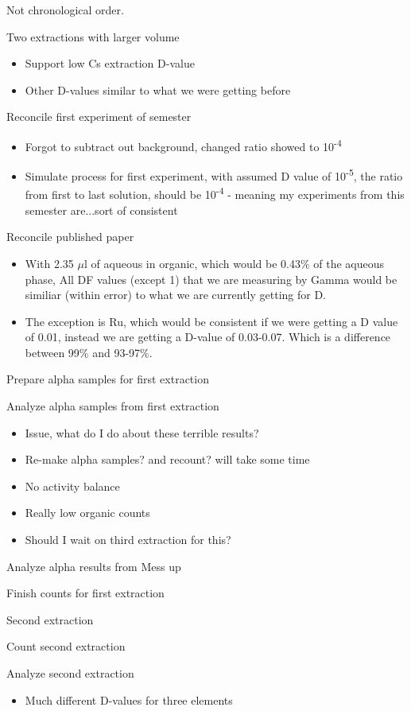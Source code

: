\documentclass[idxtotoc,hyperref,openany,oneside]{labbook} %
\newcommand{\cmark}{\ding{51}}%
\newcommand{\done}{\rlap{$\square$}{\raisebox{2pt}{\large\hspace{1pt}\cmark}}%
  \hspace{-2.5pt}}
\newcommand{\tss}{\textsuperscript}
\begin{document}
Not chronological order.
\begin{todolist}
\item[\done]{Two extractions with larger volume}
  \begin{itemize}
  \item{Support low Cs extraction D-value}
  \item{Other D-values similar to what we were getting before}
  \end{itemize}
\item[\done]{Reconcile first experiment of semester}
  \begin{itemize}
  \item{Forgot to subtract out background, changed ratio showed to 10\tss{-4}}
  \item{Simulate process for first experiment, with assumed D value of 10\tss{-5},
    the ratio from first to last solution, should be 10\tss{-4} - meaning
    my experiments from this semester are...sort of consistent}
  \end{itemize}
\item[\done]{Reconcile published paper}
  \begin{itemize}
  \item{With 2.35 $\mu$l of aqueous in organic, which would be
      0.43\% of the aqueous phase, All DF values (except 1) that we are
      measuring by Gamma would be similiar (within error) to
      what we are currently getting for D.}
    \item{The exception is Ru, which would be consistent if we
      were getting a D value of 0.01, instead we are getting a D-value
      of 0.03-0.07. Which is a difference between 99\% and
      93-97\%.}
  \end{itemize}
\item[\done]{Prepare alpha samples for first extraction}
\item[\done]{Analyze alpha samples from first extraction}
  \begin{itemize}
  \item{Issue, what do I do about these terrible results?}
  \item{Re-make alpha samples? and recount? will take some time}
  \item{No activity balance}
  \item{Really low organic counts}
  \item{Should I wait on third extraction for this?}
  \end{itemize}
\item[\done]{Analyze alpha results from Mess up}
\item[\done]{Finish counts for first extraction}
\item[\done]{Second extraction}
\item[\done]{Count second extraction}
\item[\done]{Analyze second extraction}
  \begin{itemize}
  \item{Much different D-values for three elements}
  \end{itemize}
\end{todolist}
\end{document}
